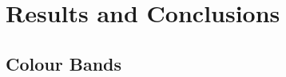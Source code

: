 \chapter{Results and Conclusions}
\begin{comment}
This section should discuss issues you encountered as you tried to implement your experiments. What were the results of running the experiments? What conclusions can you draw from these results? What graphs or other information have you assessed regarding your experiments? Discuss those.

During the work, you might have found that elements of your experiments were unnecessary or overly complex; perhaps third-party libraries were available that simplified some of the functions that you intended to implement. If things were easier in some areas, then how did you adapt your project to take account of your findings?

It is more likely that things were more complex than you first thought. In particular, were there any problems or difficulties that you found during implementation that you had to address? Did such problems simply delay you or were they more significant?

If you had multiple experiments to run, it may be sensible to discuss each experiment in separate sections.
\end{comment}


\section{Colour Bands}


